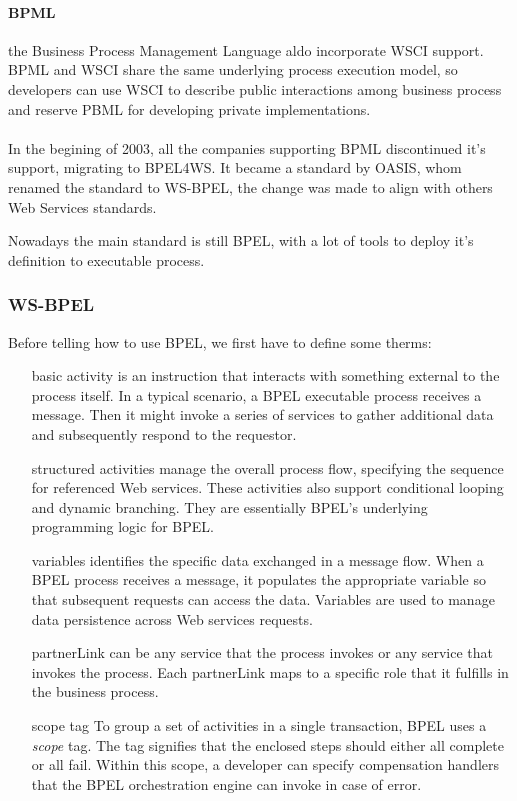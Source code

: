 \documentclass[12pt,a4paper]{article}
\begin{document}
\paragraph{BPML} 
the Business Process Management Language aldo incorporate WSCI support. BPML and WSCI share the same underlying process execution model, so developers can use WSCI to describe public interactions among business process and reserve PBML for developing private implementations.\\ \\

In the begining of 2003, all the companies supporting BPML discontinued it's support, migrating to BPEL4WS. It became a standard by OASIS, whom renamed the standard to WS-BPEL, the change was made to align with others Web Services standards.

Nowadays the main standard is still BPEL, with a lot of tools to deploy it's definition to executable process.

\subsubsection{WS-BPEL}
Before telling how to use BPEL, we first have to define some therms:
\begin{itemize}
\item[basic activity] is an instruction that interacts with something external to the process itself. In a typical scenario, a BPEL executable process receives a message. Then it might invoke a series of services to gather additional data and subsequently respond to the requestor.

\item[structured activities] manage the overall process flow, specifying the sequence for referenced Web services. These activities also support conditional looping and dynamic branching. They are essentially BPEL’s underlying programming logic for BPEL. 

\item[variables] identifies the specific data exchanged in a message flow. When a BPEL process receives a message, it populates the appropriate variable so that subsequent requests can access the data. Variables are used to manage data persistence across Web services requests.

\item[partnerLink] can be any service that the process invokes or any service that invokes the process. Each partnerLink maps to a specific role that it fulfills in the business process.

\item[scope tag] To group a set of activities in a single transaction, BPEL uses a \emph{scope} tag. The tag signifies that the enclosed steps should either all complete or all fail. Within this scope, a developer can specify compensation handlers that the BPEL orchestration engine can invoke in case of error.
\end{itemize}
\end{document}
